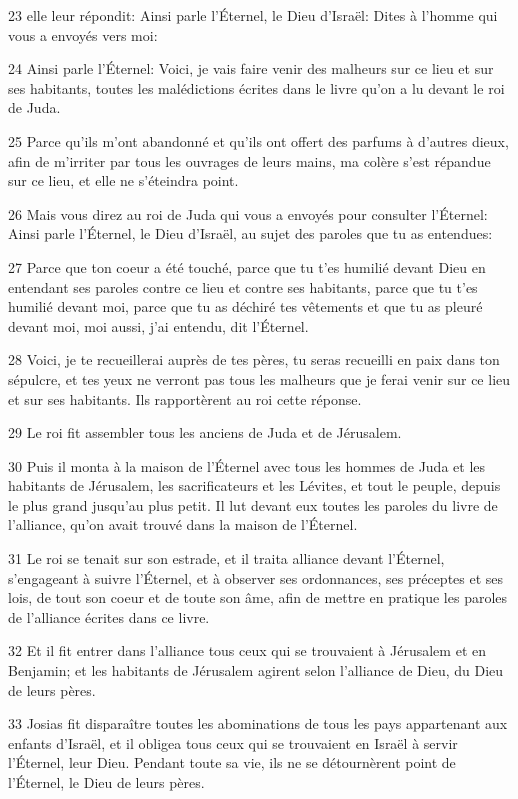 \par 23 elle leur répondit: Ainsi parle l'Éternel, le Dieu d'Israël: Dites à l'homme qui vous a envoyés vers moi:
\par 24 Ainsi parle l'Éternel: Voici, je vais faire venir des malheurs sur ce lieu et sur ses habitants, toutes les malédictions écrites dans le livre qu'on a lu devant le roi de Juda.
\par 25 Parce qu'ils m'ont abandonné et qu'ils ont offert des parfums à d'autres dieux, afin de m'irriter par tous les ouvrages de leurs mains, ma colère s'est répandue sur ce lieu, et elle ne s'éteindra point.
\par 26 Mais vous direz au roi de Juda qui vous a envoyés pour consulter l'Éternel: Ainsi parle l'Éternel, le Dieu d'Israël, au sujet des paroles que tu as entendues:
\par 27 Parce que ton coeur a été touché, parce que tu t'es humilié devant Dieu en entendant ses paroles contre ce lieu et contre ses habitants, parce que tu t'es humilié devant moi, parce que tu as déchiré tes vêtements et que tu as pleuré devant moi, moi aussi, j'ai entendu, dit l'Éternel.
\par 28 Voici, je te recueillerai auprès de tes pères, tu seras recueilli en paix dans ton sépulcre, et tes yeux ne verront pas tous les malheurs que je ferai venir sur ce lieu et sur ses habitants. Ils rapportèrent au roi cette réponse.
\par 29 Le roi fit assembler tous les anciens de Juda et de Jérusalem.
\par 30 Puis il monta à la maison de l'Éternel avec tous les hommes de Juda et les habitants de Jérusalem, les sacrificateurs et les Lévites, et tout le peuple, depuis le plus grand jusqu'au plus petit. Il lut devant eux toutes les paroles du livre de l'alliance, qu'on avait trouvé dans la maison de l'Éternel.
\par 31 Le roi se tenait sur son estrade, et il traita alliance devant l'Éternel, s'engageant à suivre l'Éternel, et à observer ses ordonnances, ses préceptes et ses lois, de tout son coeur et de toute son âme, afin de mettre en pratique les paroles de l'alliance écrites dans ce livre.
\par 32 Et il fit entrer dans l'alliance tous ceux qui se trouvaient à Jérusalem et en Benjamin; et les habitants de Jérusalem agirent selon l'alliance de Dieu, du Dieu de leurs pères.
\par 33 Josias fit disparaître toutes les abominations de tous les pays appartenant aux enfants d'Israël, et il obligea tous ceux qui se trouvaient en Israël à servir l'Éternel, leur Dieu. Pendant toute sa vie, ils ne se détournèrent point de l'Éternel, le Dieu de leurs pères.

